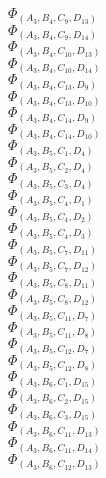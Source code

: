 \documentclass[14pt]{article}
\begin{document}
    $\Phi_{({A}_{3}, {B}_{4}, {C}_{9}, {D}_{13})}$ \\ 
    $\Phi_{({A}_{3}, {B}_{4}, {C}_{9}, {D}_{14})}$ \\ 
    $\Phi_{({A}_{3}, {B}_{4}, {C}_{10}, {D}_{13})}$ \\ 
    $\Phi_{({A}_{3}, {B}_{4}, {C}_{10}, {D}_{14})}$ \\ 
    $\Phi_{({A}_{3}, {B}_{4}, {C}_{13}, {D}_{9})}$ \\ 
    $\Phi_{({A}_{3}, {B}_{4}, {C}_{13}, {D}_{10})}$ \\ 
    $\Phi_{({A}_{3}, {B}_{4}, {C}_{14}, {D}_{9})}$ \\ 
    $\Phi_{({A}_{3}, {B}_{4}, {C}_{14}, {D}_{10})}$ \\ 
    $\Phi_{({A}_{3}, {B}_{5}, {C}_{1}, {D}_{4})}$ \\ 
    $\Phi_{({A}_{3}, {B}_{5}, {C}_{2}, {D}_{4})}$ \\ 
    $\Phi_{({A}_{3}, {B}_{5}, {C}_{3}, {D}_{4})}$ \\ 
    $\Phi_{({A}_{3}, {B}_{5}, {C}_{4}, {D}_{1})}$ \\ 
    $\Phi_{({A}_{3}, {B}_{5}, {C}_{4}, {D}_{2})}$ \\ 
    $\Phi_{({A}_{3}, {B}_{5}, {C}_{4}, {D}_{3})}$ \\ 
    $\Phi_{({A}_{3}, {B}_{5}, {C}_{7}, {D}_{11})}$ \\ 
    $\Phi_{({A}_{3}, {B}_{5}, {C}_{7}, {D}_{12})}$ \\ 
    $\Phi_{({A}_{3}, {B}_{5}, {C}_{8}, {D}_{11})}$ \\ 
    $\Phi_{({A}_{3}, {B}_{5}, {C}_{8}, {D}_{12})}$ \\ 
    $\Phi_{({A}_{3}, {B}_{5}, {C}_{11}, {D}_{7})}$ \\ 
    $\Phi_{({A}_{3}, {B}_{5}, {C}_{11}, {D}_{8})}$ \\ 
    $\Phi_{({A}_{3}, {B}_{5}, {C}_{12}, {D}_{7})}$ \\ 
    $\Phi_{({A}_{3}, {B}_{5}, {C}_{12}, {D}_{8})}$ \\ 
    $\Phi_{({A}_{3}, {B}_{6}, {C}_{1}, {D}_{15})}$ \\ 
    $\Phi_{({A}_{3}, {B}_{6}, {C}_{2}, {D}_{15})}$ \\ 
    $\Phi_{({A}_{3}, {B}_{6}, {C}_{3}, {D}_{15})}$ \\ 
    $\Phi_{({A}_{3}, {B}_{6}, {C}_{11}, {D}_{13})}$ \\ 
    $\Phi_{({A}_{3}, {B}_{6}, {C}_{11}, {D}_{14})}$ \\ 
    $\Phi_{({A}_{3}, {B}_{6}, {C}_{12}, {D}_{13})}$ \\ 
\end{document}
